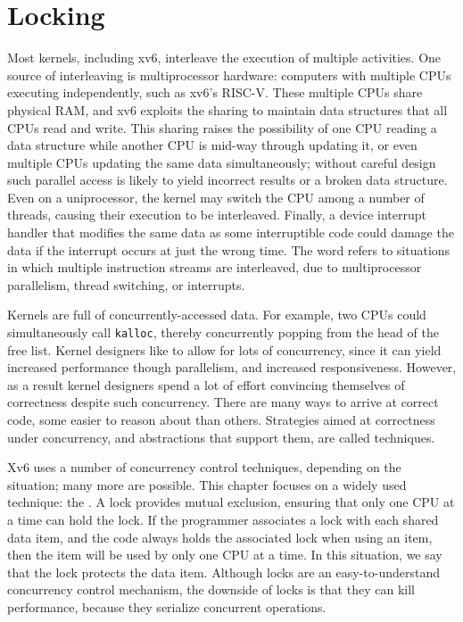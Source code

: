 \chapter{Locking}
\label{CH:LOCK}

Most kernels, including xv6, interleave the execution
of multiple activities.
One source of interleaving is multiprocessor hardware:
computers with
multiple CPUs executing independently, such as xv6's RISC-V.
These multiple CPUs share physical RAM,
and xv6 exploits the sharing to maintain
data structures that all CPUs read and write.
This sharing raises the possibility of
one CPU reading a data structure while another
CPU is mid-way through updating it, or even
multiple CPUs updating the same data simultaneously;
without careful design such parallel access is likely
to yield incorrect results or a broken data structure.
Even on a uniprocessor, the kernel may switch the CPU among
a number of threads, causing their execution to be interleaved.
Finally, a device interrupt handler that modifies
the same data as some interruptible code could damage
the data if the interrupt occurs at just the wrong time.
The word 
refers to situations in which
multiple instruction streams are interleaved,
due to multiprocessor parallelism,
thread switching, or interrupts.

Kernels are full of concurrently-accessed data. For example, two CPUs
could simultaneously call {\tt kalloc}, thereby concurrently
popping from the head of the free list. Kernel designers like to allow
for lots of concurrency, since it can yield increased performance
though parallelism, and increased responsiveness. However, as a result
kernel designers spend a lot of effort convincing themselves of
correctness despite such concurrency. There are many ways to arrive at
correct code, some easier to reason about than others. Strategies
aimed at correctness under concurrency, and abstractions that support
them, are called  techniques.

Xv6 uses a number of concurrency control techniques, depending on the
situation; many more are possible. This chapter focuses on a widely
used technique: the .  A lock provides mutual
exclusion, ensuring that only one CPU at a time can hold the lock. If
the programmer associates a lock with each shared data item, and the
code always holds the associated lock when using an item, then the
item will be used by only one CPU at a time.  In this situation, we
say that the lock protects the data item.  Although locks are an
easy-to-understand concurrency control mechanism, the downside of
locks is that they can kill performance, because they serialize
concurrent operations.

